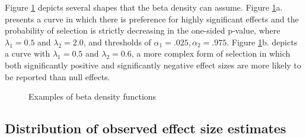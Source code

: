 \documentclass[
  man, donotrepeattitle,floatsintext]{apa7}
\begin{document}
Figure \ref{fig:beta-functions} depicts several shapes that the beta density can assume. Figure \ref{fig:beta-functions}a. presents a curve in which there is preference for highly significant effects and the probability of selection is strictly decreasing in the one-sided p-value, where \(\lambda_1 = 0.5\) and \(\lambda_2 = 2.0\), and thresholds of \(\alpha_1 = .025, \alpha_2 = .975\). Figure \ref{fig:beta-functions}b. depicts a curve with \(\lambda_1 = 0.5\) and \(\lambda_2 = 0.6\), a more complex form of selection in which both significantly positive and significantly negative effect sizes are more likely to be reported than null effects.

\begin{figure}[tb]
\caption{Examples of beta density functions}\label{fig:beta-functions}
\end{figure}

\subsection{Distribution of observed effect size estimates}\label{distribution-of-observed-effect-size-estimates}
\end{document}
